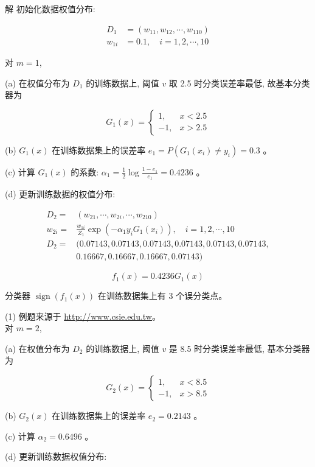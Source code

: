 \documentclass[10pt]{article}
\begin{document}
解 初始化数据权值分布:

$$
\begin{aligned}
D_{1} & =\left(w_{11}, w_{12}, \cdots, w_{110}\right) \\
w_{1 i} & =0.1, \quad i=1,2, \cdots, 10
\end{aligned}
$$

对 $m=1$,

(a) 在权值分布为 $D_{1}$ 的训练数据上, 阈值 $v$ 取 2.5 时分类误差率最低, 故基本分类器为

$$
G_{1}(x)= \begin{cases}1, & x<2.5 \\ -1, & x>2.5\end{cases}
$$

(b) $G_{1}(x)$ 在训练数据集上的误差率 $e_{1}=P\left(G_{1}\left(x_{i}\right) \neq y_{i}\right)=0.3$ 。

(c) 计算 $G_{1}(x)$ 的系数: $\alpha_{1}=\frac{1}{2} \log \frac{1-e_{1}}{e_{1}}=0.4236$ 。

(d) 更新训练数据的权值分布:

$$
\begin{aligned}
D_{2}= & \left(w_{21}, \cdots, w_{2 i}, \cdots, w_{210}\right) \\
w_{2 i}= & \frac{w_{1 i}}{Z_{1}} \exp \left(-\alpha_{1} y_{i} G_{1}\left(x_{i}\right)\right), \quad i=1,2, \cdots, 10 \\
D_{2}= & (0.07143,0.07143,0.07143,0.07143,0.07143,0.07143, \\
& 0.16667,0.16667,0.16667,0.07143)
\end{aligned}
$$

$$
f_{1}(x)=0.4236 G_{1}(x)
$$

分类器 $\operatorname{sign}\left(f_{1}(x)\right)$ 在训练数据集上有 3 个误分类点。

(1) 例题来源于 \href{http://www.csie.edu.tw}{http://www.csie.edu.tw}。\\
对 $m=2$,

(a) 在权值分布为 $D_{2}$ 的训练数据上, 阈值 $v$ 是 8.5 时分类误差率最低, 基本分类器为

$$
G_{2}(x)= \begin{cases}1, & x<8.5 \\ -1, & x>8.5\end{cases}
$$

(b) $G_{2}(x)$ 在训练数据集上的误差率 $e_{2}=0.2143$ 。

(c) 计算 $\alpha_{2}=0.6496$ 。

(d) 更新训练数据权值分布:
\end{document}
